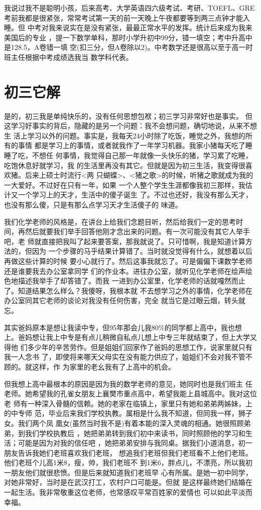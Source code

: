 \documentclass[12pt]{book}
\begin{document}
        我说过我不是聪明小孩，后来高考、大学英语四六级考试、考研、TOEFL、GRE
考前我都是很紧张，常常考试第一天的前一天晚上午夜都要等到两三点钟才能入睡。但
中考对我来说实在是没有紧张，最最正常水平的发挥。统计后来成为我来美国后的专业
，提一下数学单科，那时小学升初中99分，错一填空；考中升高中是128.5，A卷错一填
空(扣三分，但A卷除以2)。中考数学还是很高以至于高一时班主任根据中考成绩选我当
数学科代表。
\section{初三它解}
\label{sec-2-7}

        是的，初三我是单纯快乐的，没有任何思想包袱；初三学习非常好也是事实。
但这学习好事实的背后，隐藏的是另一个问题：我不会想问题，确切地说，从来不想生
活上学习以外的问题。事实是，我每天24小时除了吃饭，睡觉之外，我想的所有的事情
都是学习上的事情，或者就我作了一年学习机器。我家小猪每天吃了睡睡了吃，不想任
何事情，我觉得自己那一年就像一头快乐的猪，学习累了吃睡，吃饱休息好就学习，我
的生活里再没有其它。但就是因为初三生活，我变得很喜欢猪。后来上硕士时流行<两
只蝴蝶>、<猪之歌>的时候，听猪之歌就成为我的一大爱好。不过好在只有一年，如果
一个人整个学生生涯都像我初三那样，我估计又一个学习上的天才，生活中的傻子诞生
了。不过也还好，我没有那么天才，也没有那么傻，只是有那么点学习天才生活傻子的
味道。

        我们化学老师的风格是，在讲台上给我们念题目听，然后给我们一定的思考时
间，再然后就要我们举手回答他刚才念出来的问题。有一次可能没有其它人举手吧，老
师就直接把我叫了起来要答案，那我就说了。只可惜啊，我是知道计算方法的，但因为
一个步骤的马乎结果计算错了。当时就没觉得有什么，就想着以后再做这些计算的时候
要小心就行了。然后这事我就忘了。可是偏偏下课数学老师还是谁要我去办公室拿同学
们的作业本。进往办公室，就听见化学老师在绘声绘色地描述我举手了却答错了。而我
一进到办公室里，化学老师的话就嘎然而止了。知道结果怎么样么？我傻呀，我根本就
不去想学习之外的事情，化学老师在办公室同其它老师的谈论对我没有任何伤害，完全
就当它是过眼云烟，转头就忘。

        其实爸妈原本是想让我读中专，但95年那会儿我80\%的同学都上高中，我也想
上。爸妈想让我上中专是有点儿稍微自私点儿想上中专三年就结束了，但上大学又得他
们多少年的辛苦劳作。但是姐姐们回家作了爸妈的思想工作，说家里就只有我一人念书
了，即使将来哪天父母实在没有能力供应了，姐姐们不会对我不管不顾的。就这样，作
为家里的老幺我有了上高中的机会。

        但我想上高中最根本的原因是因为我的数学老师的意见，她同时也是我们班主
任老师。她希望我的孔雀女朋友上襄樊市重点高中，希望我能上县城高中。我对这位老
师有一种深入骨髓的信赖。她的老家在临镇上，家里只有她和弟弟两姊妹，上的中专师
范，毕业后来我们学校执教。属相是什么我不知道，但同我一样，狮子女。我们两个凤
凰女(虽然当时我不是)有着本能的深入灵魂的相通。她很照顾弟弟，到我们学校执教后
，她把弟弟转到我们初中来读书，同时照顾他的学习和生活；可能是因为对我的信任吧
，她把弟弟安排与我同桌。据我们小道消息，初一朋友告诉我她们老班喜欢我们老班，
想追我们老班但我们老班看不上他们老班。他们老班个儿高1米8，瘦，帅，我们老班不
到1米6，胖点儿，不漂亮，所以我初一朋友他们就很悲愤。但是后来就知道我们老班早
心有所属。是她一初中同学，对她非常好，当时是在武汉打工，农村户口可能是。但就
是这样最终她们结婚在一起生活。我非常敬重这位老师，也常感叹平常百姓家的爱情也
可以如此平淡而幸福。
\end{document}
